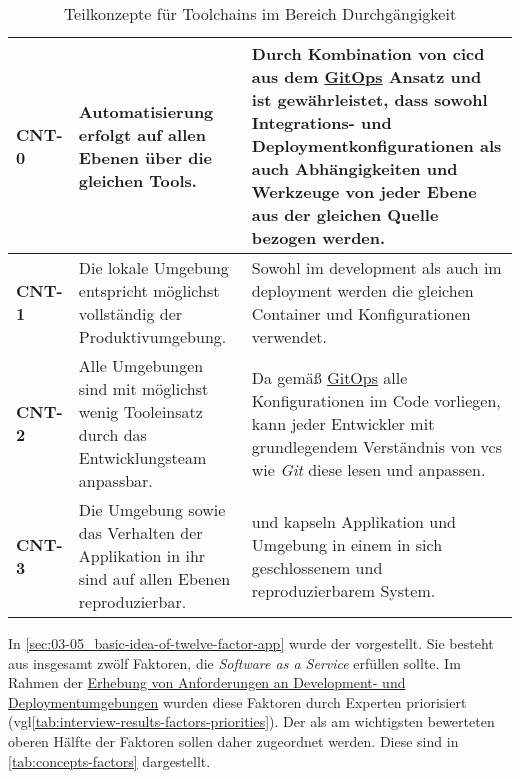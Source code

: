 \begin{table}[H]
    \begin{tabular}{ >{\bfseries\ttfamily}p{} >{}p{} | >{}p{} }
        CNT-0   &   Automatisierung erfolgt auf allen Ebenen über die gleichen Tools. &
        Durch Kombination von \Gls{cicd} aus dem \hyperref[sec:03-03_gitops-as-further-evolution]{GitOps} Ansatz und \nameref{sec:02-03_containerization} ist gewährleistet, dass sowohl Integrations- und Deploymentkonfigurationen als auch Abhängigkeiten und Werkzeuge von jeder Ebene aus der gleichen Quelle bezogen werden. \\
        \hline
        CNT-1   &   Die lokale Umgebung entspricht möglichst vollständig der Produktivumgebung. &
        Sowohl im \Gls{development} als auch im \Gls{deployment} werden die gleichen Container und Konfigurationen verwendet. \\
        \hline
        CNT-2   &   Alle Umgebungen sind mit möglichst wenig Tooleinsatz durch das Entwicklungsteam anpassbar. &
        Da gemäß \hyperref[sec:03-03_gitops-as-further-evolution]{GitOps} alle Konfigurationen im Code vorliegen, kann jeder Entwickler mit grundlegendem Verständnis von \Gls{vcs} wie \textit{Git} diese lesen und anpassen. \\
        \hline
        CNT-3   &   Die Umgebung sowie das Verhalten der Applikation in ihr sind auf allen Ebenen reproduzierbar. &
        \nameref{subsec:05-01-01_docker-container} und \nameref{subsec:05-01-02_dev-container} kapseln Applikation und Umgebung in einem in sich geschlossenem und reproduzierbarem System. \\
    \end{tabular}
    \caption{Teilkonzepte für Toolchains im Bereich Durchgängigkeit}
    \label{tab:concepts-continuity}
\end{table}

In \autoref{sec:03-05_basic-idea-of-twelve-factor-app} wurde der  vorgestellt. Sie besteht aus insgesamt zwölf Faktoren, die \textit{Software as a Service} erfüllen sollte. Im Rahmen der \hyperref[sec:04-01_collection-of-requirements-using-expert-interviews]{Erhebung von Anforderungen an Development- und Deploymentumgebungen} wurden diese Faktoren durch Experten priorisiert (\acrshort{vgl}\autoref{tab:interview-results-factors-priorities}). Der als am wichtigsten bewerteten oberen Hälfte der Faktoren sollen daher  zugeordnet werden. Diese sind in \autoref{tab:concepts-factors} dargestellt.

